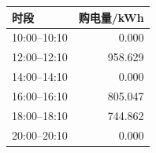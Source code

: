 \begin{tabular}{lr}
\toprule
时段 & 购电量/kWh \\
\midrule
10:00--10:10 & 0.000 \\
12:00--12:10 & 958.629 \\
14:00--14:10 & 0.000 \\
16:00--16:10 & 805.047 \\
18:00--18:10 & 744.862 \\
20:00--20:10 & 0.000 \\
\bottomrule
\end{tabular}
